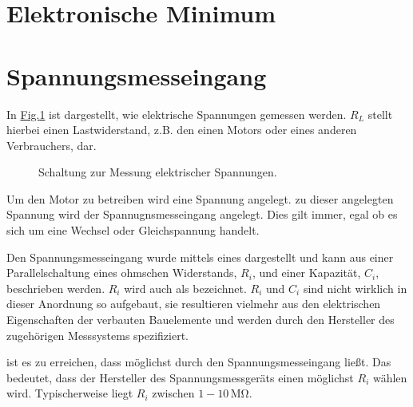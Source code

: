 \documentclass[letterpaper,10pt,english]{jupyterBook}
\let\sphinxpxdimen\pdfpxdimen\else\newdimen\sphinxpxdimen
\begin{document}
\sphinxstepscope


\section{Elektronische Minimum}
\label{\detokenize{content/4_Grundlagen_Elektronik:elektronische-minimum}}\label{\detokenize{content/4_Grundlagen_Elektronik::doc}}
\sphinxstepscope


\section{Spannungsmesseingang}
\label{\detokenize{content/4_U-Messeingang:spannungsmesseingang}}\label{\detokenize{content/4_U-Messeingang::doc}}
\sphinxAtStartPar
In \hyperref[\detokenize{content/4_U-Messeingang:spannungsmesseingang-last}]{Fig.\@ \ref{\detokenize{content/4_U-Messeingang:spannungsmesseingang-last}}} ist dargestellt, wie elektrische Spannungen gemessen werden. \(R_L\) stellt hierbei einen Lastwiderstand, z.B. den einen Motors oder eines anderen Verbrauchers, dar.

\begin{figure}[htbp]
\centering
\capstart

\noindent\sphinxincludegraphics[width=400\sphinxpxdimen]{{spannungsmesseingang_last}.jpg}
\caption{Schaltung zur Messung elektrischer Spannungen.}\label{\detokenize{content/4_U-Messeingang:spannungsmesseingang-last}}\end{figure}

\sphinxAtStartPar
Um den Motor zu betreiben wird eine Spannung angelegt.  zu dieser angelegten Spannung wird der Spannugnsmesseingang angelegt. Dies gilt immer, egal ob es sich um eine Wechsel\sphinxhyphen{} oder Gleichspannung handelt.

\sphinxAtStartPar
Den Spannungsmesseingang wurde mittels eines  dargestellt und kann aus einer Parallelschaltung eines ohmschen Widerstands, \(R_i\), und einer Kapazität, \(C_i\), beschrieben werden.
\(R_i\) wird auch als  bezeichnet. \(R_i\) und \(C_i\) sind nicht wirklich in dieser Anordnung so aufgebaut, sie resultieren vielmehr aus den elektrischen Eigenschaften der verbauten Bauelemente und werden durch den Hersteller des zugehörigen Messsystems spezifiziert.

\sphinxAtStartPar
{} ist es zu erreichen, dass möglichst  durch den Spannungsmesseingang ließt. Das bedeutet, dass der Hersteller des Spannungsmessgeräts einen möglichst  \(R_i\) wählen wird. Typischerweise liegt \(R_i\) zwischen \(1-10\,\mathrm{M\Omega}\).
\end{document}
